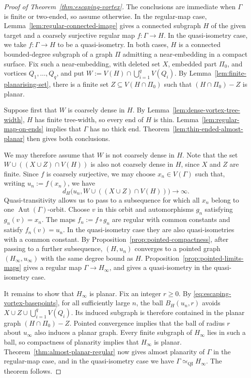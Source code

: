 \documentclass[10pt,a4paper]{amsart}
\theoremstyle{definition}
\begin{document}
\begin{proof}[Proof of Theorem~\ref{thm:escaping-vortex}]
The conclusions are immediate when $\Gamma$ is finite or two-ended, so assume otherwise.
In the regular-map case, Lemma~\ref{lem:regular-connected-image} gives a connected subgraph $H$ of the given target and a coarsely surjective regular map $f:\Gamma\to H$.
In the quasi-isometry case, we take $f:\Gamma\to H$ to be a quasi-isometry.
In both cases, $H$ is a connected bounded-degree subgraph of a graph $\Pi$ admitting a near-embedding in a compact surface.
Fix such a near-embedding, with deleted set $X$, embedded part $\Pi_0$, and vortices $Q_1,\ldots,Q_q$, and put $W:=V(H)\cap\bigcup_{i=1}^q V(Q_i)$.
By Lemma~\ref{lem:finite-planarising-set}, there is a finite set $Z\subseteq V(H\cap\Pi_0)$ such that $(H\cap\Pi_0)-Z$ is planar.

Suppose first that $W$ is coarsely dense in $H$.
By Lemma~\ref{lem:dense-vortex-tree-width}, $H$ has finite tree-width, so every end of $H$ is thin.
Lemma~\ref{lem:regular-map-on-ends} implies that $\Gamma$ has no thick end.
Theorem~\ref{lem:thin-ended-almost-planar} then gives both conclusions.

We may therefore assume that $W$ is not coarsely dense in $H$.
Note that the set $W\cup((X\cup Z)\cap V(H))$ is also not coarsely dense in $H$, since $X$ and $Z$ are finite. 
Since $f$ is coarsely surjective, we may choose $x_n\in V(\Gamma)$ such that, writing $u_n:=f(x_n)$, we have
\begin{equation}\label{eq:escaping-vortex-basepoints}
d_H\bigl(u_n,W\cup((X\cup Z)\cap V(H))\bigr)\longrightarrow\infty.
\end{equation}
Quasi-transitivity allows us to pass to a subsequence for which all $x_n$ belong to one $\operatorname{Aut}(\Gamma)$-orbit.
Choose $v$ in this orbit and automorphisms $g_n$ satisfying $g_n(v)=x_n$.
The maps $f_n:=f\circ g_n$ are regular with common constants and satisfy $f_n(v)=u_n$.
In the quasi-isometry case they are also quasi-isometries with a common constant.
By Proposition~\ref{prop:pointed-compactness}, after passing to a further subsequence, $(H,u_n)$ converges to a pointed graph $(H_\infty,u_\infty)$ with the same degree bound as $H$.
Proposition~\ref{prop:pointed-limits-maps} gives a regular map $\Gamma\to H_\infty$, and gives a quasi-isometry in the quasi-isometry case.

It remains to show that $H_\infty$ is planar. 
Fix an integer $r\geq0$.
By \eqref{eq:escaping-vortex-basepoints}, for all sufficiently large $n$, the ball $B_H(u_n,r)$ avoids $X\cup Z\cup\bigcup_{i=1}^q V(Q_i)$.
Its induced subgraph is therefore contained in the planar graph $(H\cap\Pi_0)-Z$.
Pointed convergence implies that the ball of radius $r$ about $u_\infty$ also induces a planar graph.
Every finite subgraph of $H_\infty$ lies in such a ball, so compactness of planarity implies that $H_\infty$ is planar.
Theorem~\ref{thm:almost-planar-regular} now gives almost planarity of $\Gamma$ in the regular-map case, and in the quasi-isometry case we have $\Gamma\simeq_{\mathrm{QI}}H_\infty$. The theorem follows. 
\end{proof}
\end{document}
